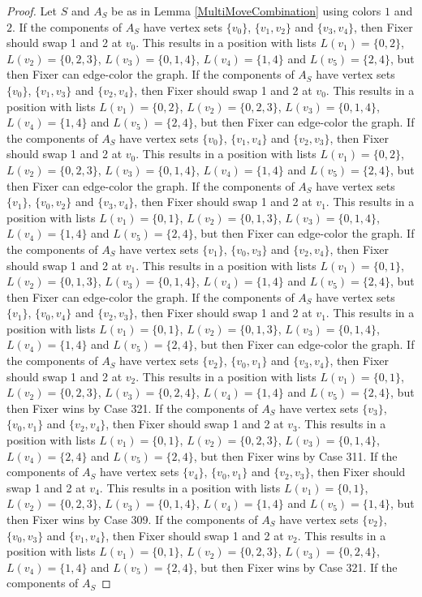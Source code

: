 \documentclass[12pt]{amsart}
\theoremstyle{plain}
\theoremstyle{definition}
\theoremstyle{remark}
\begin{document}
\begin{proof}
Let $S$ and $A_S$ be as in Lemma \ref{MultiMoveCombination} using colors $1$ and $2$. If the components of $A_S$ have vertex sets $\{v_0\}$, $\{v_1, v_2\}$ and $\{v_3, v_4\}$, then Fixer should swap 1 and 2 at $v_0$. This results in a position with lists $L(v_1) = \{0, 2\}$, $L(v_2) = \{0, 2, 3\}$, $L(v_3) = \{0, 1, 4\}$, $L(v_4) = \{1, 4\}$ and $L(v_5) = \{2, 4\}$, but then Fixer can edge-color the graph. If the components of $A_S$ have vertex sets $\{v_0\}$, $\{v_1, v_3\}$ and $\{v_2, v_4\}$, then Fixer should swap 1 and 2 at $v_0$. This results in a position with lists $L(v_1) = \{0, 2\}$, $L(v_2) = \{0, 2, 3\}$, $L(v_3) = \{0, 1, 4\}$, $L(v_4) = \{1, 4\}$ and $L(v_5) = \{2, 4\}$, but then Fixer can edge-color the graph. If the components of $A_S$ have vertex sets $\{v_0\}$, $\{v_1, v_4\}$ and $\{v_2, v_3\}$, then Fixer should swap 1 and 2 at $v_0$. This results in a position with lists $L(v_1) = \{0, 2\}$, $L(v_2) = \{0, 2, 3\}$, $L(v_3) = \{0, 1, 4\}$, $L(v_4) = \{1, 4\}$ and $L(v_5) = \{2, 4\}$, but then Fixer can edge-color the graph. If the components of $A_S$ have vertex sets $\{v_1\}$, $\{v_0, v_2\}$ and $\{v_3, v_4\}$, then Fixer should swap 1 and 2 at $v_1$. This results in a position with lists $L(v_1) = \{0, 1\}$, $L(v_2) = \{0, 1, 3\}$, $L(v_3) = \{0, 1, 4\}$, $L(v_4) = \{1, 4\}$ and $L(v_5) = \{2, 4\}$, but then Fixer can edge-color the graph. If the components of $A_S$ have vertex sets $\{v_1\}$, $\{v_0, v_3\}$ and $\{v_2, v_4\}$, then Fixer should swap 1 and 2 at $v_1$. This results in a position with lists $L(v_1) = \{0, 1\}$, $L(v_2) = \{0, 1, 3\}$, $L(v_3) = \{0, 1, 4\}$, $L(v_4) = \{1, 4\}$ and $L(v_5) = \{2, 4\}$, but then Fixer can edge-color the graph. If the components of $A_S$ have vertex sets $\{v_1\}$, $\{v_0, v_4\}$ and $\{v_2, v_3\}$, then Fixer should swap 1 and 2 at $v_1$. This results in a position with lists $L(v_1) = \{0, 1\}$, $L(v_2) = \{0, 1, 3\}$, $L(v_3) = \{0, 1, 4\}$, $L(v_4) = \{1, 4\}$ and $L(v_5) = \{2, 4\}$, but then Fixer can edge-color the graph. If the components of $A_S$ have vertex sets $\{v_2\}$, $\{v_0, v_1\}$ and $\{v_3, v_4\}$, then Fixer should swap 1 and 2 at $v_2$. This results in a position with lists $L(v_1) = \{0, 1\}$, $L(v_2) = \{0, 2, 3\}$, $L(v_3) = \{0, 2, 4\}$, $L(v_4) = \{1, 4\}$ and $L(v_5) = \{2, 4\}$, but then Fixer wins by Case 321. If the components of $A_S$ have vertex sets $\{v_3\}$, $\{v_0, v_1\}$ and $\{v_2, v_4\}$, then Fixer should swap 1 and 2 at $v_3$. This results in a position with lists $L(v_1) = \{0, 1\}$, $L(v_2) = \{0, 2, 3\}$, $L(v_3) = \{0, 1, 4\}$, $L(v_4) = \{2, 4\}$ and $L(v_5) = \{2, 4\}$, but then Fixer wins by Case 311. If the components of $A_S$ have vertex sets $\{v_4\}$, $\{v_0, v_1\}$ and $\{v_2, v_3\}$, then Fixer should swap 1 and 2 at $v_4$. This results in a position with lists $L(v_1) = \{0, 1\}$, $L(v_2) = \{0, 2, 3\}$, $L(v_3) = \{0, 1, 4\}$, $L(v_4) = \{1, 4\}$ and $L(v_5) = \{1, 4\}$, but then Fixer wins by Case 309. If the components of $A_S$ have vertex sets $\{v_2\}$, $\{v_0, v_3\}$ and $\{v_1, v_4\}$, then Fixer should swap 1 and 2 at $v_2$. This results in a position with lists $L(v_1) = \{0, 1\}$, $L(v_2) = \{0, 2, 3\}$, $L(v_3) = \{0, 2, 4\}$, $L(v_4) = \{1, 4\}$ and $L(v_5) = \{2, 4\}$, but then Fixer wins by Case 321. If the components of $A_S$ 
\end{proof}
\end{document}
